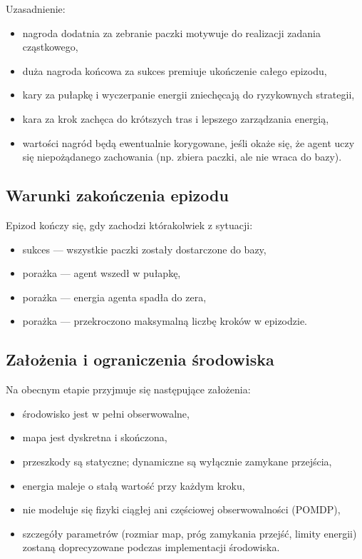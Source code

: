 \documentclass[12pt]{article}
\begin{document}
Uzasadnienie:
\begin{itemize}
    \item nagroda dodatnia za zebranie paczki motywuje do realizacji zadania cząstkowego,
    \item duża nagroda końcowa za sukces premiuje ukończenie całego epizodu,
    \item kary za pułapkę i wyczerpanie energii zniechęcają do ryzykownych strategii,
    \item kara za krok zachęca do krótszych tras i lepszego zarządzania energią,
    \item wartości nagród będą ewentualnie korygowane, jeśli okaże się, że agent uczy się
    niepożądanego zachowania (np. zbiera paczki, ale nie wraca do bazy).
\end{itemize}

\subsection{Warunki zakończenia epizodu}

Epizod kończy się, gdy zachodzi którakolwiek z sytuacji:
\begin{itemize}
    \item sukces --- wszystkie paczki zostały dostarczone do bazy,
    \item porażka --- agent wszedł w pułapkę,
    \item porażka --- energia agenta spadła do zera,
    \item porażka --- przekroczono maksymalną liczbę kroków w epizodzie.
\end{itemize}

\subsection{Założenia i ograniczenia środowiska}

Na obecnym etapie przyjmuje się następujące założenia:
\begin{itemize}
    \item środowisko jest w pełni obserwowalne,
    \item mapa jest dyskretna i skończona,
    \item przeszkody są statyczne; dynamiczne są wyłącznie zamykane przejścia,
    \item energia maleje o stałą wartość przy każdym kroku,
    \item nie modeluje się fizyki ciągłej ani częściowej obserwowalności (POMDP),
    \item szczegóły parametrów (rozmiar map, próg zamykania przejść, limity energii)
    zostaną doprecyzowane podczas implementacji środowiska.
\end{itemize}
\end{document}
